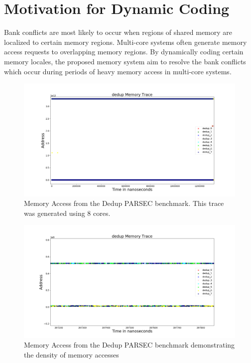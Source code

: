 \section{Motivation for Dynamic Coding}\label{sec:parsec_motivation}
 Bank conflicts are most likely to occur when regions of shared memory are localized to certain memory regions. Multi-core systems often generate memory access requests to overlapping memory regions. By dynamically coding certain memory locales, the proposed memory system aim to resolve the bank conflicts which occur during periods of heavy memory access in multi-core systems.

\begin{figure}[htbp]
		\includegraphics[width=\linewidth]{fig/dedup_whole.png}
		\caption{Memory Access from the Dedup PARSEC benchmark. This trace was generated using 8 cores.}
		\label{fig:dedup_whole}
\end{figure}

\begin{figure}[htbp]
		\includegraphics[width=\linewidth]{fig/dedup_dense.png}
		\caption{Memory Access from the Dedup PARSEC benchmark demonstrating the density of memory accesses}
		\label{fig:dedup_dense}
\end{figure}

